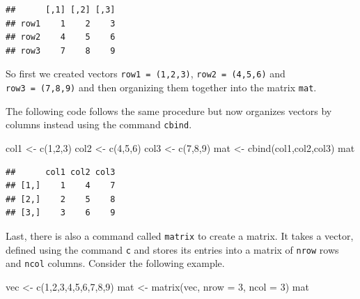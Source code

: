 \documentclass[
]{book}
\newenvironment{Shaded}{\begin{snugshade}}{\end{snugshade}}
\newcommand{\AttributeTok}[1]{\textcolor[rgb]{0.77,0.63,0.00}{#1}}
\newcommand{\DecValTok}[1]{\textcolor[rgb]{0.00,0.00,0.81}{#1}}
\newcommand{\FunctionTok}[1]{\textcolor[rgb]{0.00,0.00,0.00}{#1}}
\newcommand{\NormalTok}[1]{#1}
\newcommand{\OtherTok}[1]{\textcolor[rgb]{0.56,0.35,0.01}{#1}}
\begin{document}
\begin{verbatim}
##      [,1] [,2] [,3]
## row1    1    2    3
## row2    4    5    6
## row3    7    8    9
\end{verbatim}

So first we created vectors \texttt{row1\ =\ (1,2,3)}, \texttt{row2\ =\ (4,5,6)} and \texttt{row3\ =\ (7,8,9)} and then organizing them together into the matrix \texttt{mat}.

The following code follows the same procedure but now organizes vectors by columns instead using the command \texttt{cbind}.

\begin{Shaded}
\begin{Highlighting}[]
\NormalTok{col1 }\OtherTok{\textless{}{-}} \FunctionTok{c}\NormalTok{(}\DecValTok{1}\NormalTok{,}\DecValTok{2}\NormalTok{,}\DecValTok{3}\NormalTok{)}
\NormalTok{col2 }\OtherTok{\textless{}{-}} \FunctionTok{c}\NormalTok{(}\DecValTok{4}\NormalTok{,}\DecValTok{5}\NormalTok{,}\DecValTok{6}\NormalTok{)}
\NormalTok{col3 }\OtherTok{\textless{}{-}} \FunctionTok{c}\NormalTok{(}\DecValTok{7}\NormalTok{,}\DecValTok{8}\NormalTok{,}\DecValTok{9}\NormalTok{)}
\NormalTok{mat }\OtherTok{\textless{}{-}} \FunctionTok{cbind}\NormalTok{(col1,col2,col3)}
\NormalTok{mat}
\end{Highlighting}
\end{Shaded}

\begin{verbatim}
##      col1 col2 col3
## [1,]    1    4    7
## [2,]    2    5    8
## [3,]    3    6    9
\end{verbatim}

Last, there is also a command called \texttt{matrix} to create a matrix. It takes a vector, defined using the command \texttt{c} and stores its entries into a matrix of \texttt{nrow} rows and \texttt{ncol} columns. Consider the following example.

\begin{Shaded}
\begin{Highlighting}[]
\NormalTok{vec }\OtherTok{\textless{}{-}} \FunctionTok{c}\NormalTok{(}\DecValTok{1}\NormalTok{,}\DecValTok{2}\NormalTok{,}\DecValTok{3}\NormalTok{,}\DecValTok{4}\NormalTok{,}\DecValTok{5}\NormalTok{,}\DecValTok{6}\NormalTok{,}\DecValTok{7}\NormalTok{,}\DecValTok{8}\NormalTok{,}\DecValTok{9}\NormalTok{)}
\NormalTok{mat }\OtherTok{\textless{}{-}} \FunctionTok{matrix}\NormalTok{(vec, }\AttributeTok{nrow =} \DecValTok{3}\NormalTok{, }\AttributeTok{ncol =} \DecValTok{3}\NormalTok{)}
\NormalTok{mat}
\end{Highlighting}
\end{Shaded}
\end{document}
